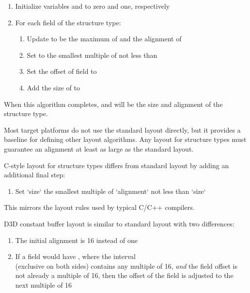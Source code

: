 \begin{enumerate}
  \item{Initialize variables  and  to zero and one, respectively}
  \item{For each field  of the structure type:}
  \begin{enumerate}
    \item {Update  to be the maximum of  and the alignment of }
    \item {Set  to the smallest multiple of  not less than }
    \item {Set the offset of field  to }
    \item {Add the size of  to }
  \end{enumerate}
\end{enumerate}

When this algorithm completes,  and  will be the size and alignment of the structure type.

Most target platforms do not use the standard layout directly, but it provides a baseline for defining other layout algorithms.
Any layout for structure types must guarantee an alignment at least as large as the standard layout.


C-style layout for structure types differs from standard layout by adding an additional final step:

\begin{enumerate}
  \item {Set `size` the smallest multiple of `alignment` not less than `size`} 
\end{enumerate}

This mirrors the layout rules used by typical C/C++ compilers.


D3D constant buffer layout is similar to standard layout with two differences:

\begin{enumerate}
\item{The initial alignment is 16 instead of one}
\item{If a field would have , where the interval \\
 (exclusive on both sides) contains any multiple of 16, \emph{and} the field offset is not already a multiple of 16, then the offset of the field is adjusted to the next multiple of 16}
\end{enumerate}

